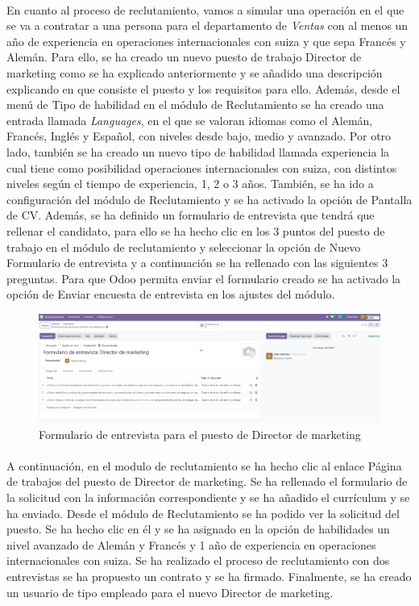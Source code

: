 \paragraph{}
En cuanto al proceso de reclutamiento, vamos a simular una operación en el que se va a contratar a una persona para el departamento de \textit{Ventas} con al menos un año de experiencia en operaciones internacionales con suiza y que sepa Francés y Alemán. Para ello, se ha creado un nuevo puesto de trabajo Director de marketing como se ha explicado anteriormente y se añadido una descripción explicando en que consiste el puesto y los requisitos para ello. Además, desde el menú de Tipo de habilidad en el módulo de Reclutamiento se ha creado una entrada llamada \textit{Languages}, en el que se valoran idiomas como el Alemán, Francés, Inglés y Español, con niveles desde bajo, medio y avanzado. Por otro lado, también se ha creado un nuevo tipo de habilidad llamada experiencia la cual tiene como posibilidad operaciones internacionales con suiza, con distintos niveles según el tiempo de experiencia, 1, 2 o 3 años. También, se ha ido a configuración del módulo de Reclutamiento y se ha activado la opción de Pantalla de CV. Además, se ha definido un formulario de entrevista que tendrá que rellenar el candidato, para ello se ha hecho clic en los 3 puntos del puesto de trabajo en el módulo de reclutamiento y seleccionar la opción de Nuevo Formulario de entrevista y a continuación se ha rellenado con las siguientes 3 preguntas. Para que Odoo permita enviar el formulario creado se ha activado la opción de Enviar encuesta de entrevista en los ajustes del módulo.
\begin{figure}[h]
    \centering
    \includegraphics[width=1\linewidth]{fotosGestPers/image.png}
    \caption{Formulario de entrevista para el puesto de Director de marketing}
    \label{fig:enter-label}
\end{figure}
\paragraph{}
A continuación, en el modulo de reclutamiento se ha hecho clic al enlace Página de trabajos del puesto de Director de marketing. Se ha rellenado el formulario de la solicitud con la información correspondiente y se ha añadido el currículum y se ha enviado. Desde el módulo de Reclutamiento se ha podido ver la solicitud del puesto. Se ha hecho clic en él y se ha asignado en la opción de habilidades un nivel avanzado de Alemán y Francés y 1 año de experiencia en operaciones internacionales con suiza. Se ha realizado el proceso de reclutamiento con dos entrevistas se ha propuesto un contrato y se ha firmado. Finalmente, se ha creado un usuario de tipo empleado para el nuevo Director de marketing.
\newpage
